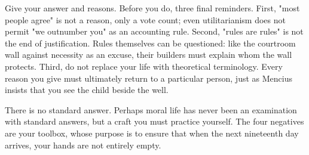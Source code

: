 Give your answer and reasons. Before you do, three final reminders. First, "most people agree" is not a reason, only a vote count; even utilitarianism does not permit "we outnumber you" as an accounting rule. Second, "rules are rules" is not the end of justification. Rules themselves can be questioned: like the courtroom wall against necessity as an excuse, their builders must explain whom the wall protects. Third, do not replace your life with theoretical terminology. Every reason you give must ultimately return to a particular person, just as Mencius insists that you see the child beside the well.

There is no standard answer. Perhaps moral life has never been an examination with standard answers, but a craft you must practice yourself. The four negatives are your toolbox, whose purpose is to ensure that when the next nineteenth day arrives, your hands are not entirely empty.
